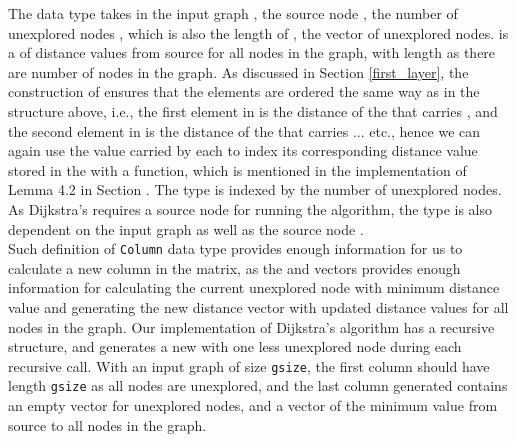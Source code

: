 The  data type takes in the input graph , the source node , the number of unexplored nodes , which is also the length of , the vector of unexplored nodes.  is a  of distance values from source for all nodes in the graph, with length  as there are  number of nodes in the graph. As discussed in Section \ref{first_layer}, the construction of  ensures that the elements are ordered the same way as  in the  structure above, i.e., the first element in  is the distance of the  that carries , and the second element in  is the distance of the  that carries  ... etc., hence we can again use the value carried by each  to index its corresponding distance value stored in the  with a  function, which is mentioned in the implementation of Lemma 4.2 in Section . The  type is indexed by the number of unexplored nodes. As Dijkstra's requires a source node for running the algorithm, the type  is also dependent on the input graph as well as the source node .
\\

Such definition of \texttt{Column} data type provides enough information for us to calculate a new column in the matrix, as the  and  vectors provides enough information for calculating the current unexplored node with minimum distance value and generating the new distance vector with updated distance values for all nodes in the graph. Our implementation of Dijkstra's algorithm has a recursive structure, and generates a new  with one less unexplored node during each recursive call. With an input graph of size \texttt{gsize}, the first column should have length \texttt{gsize} as all nodes are unexplored, and the last column generated contains an empty vector for unexplored nodes, and a vector of the minimum value from source to all nodes in the graph. 
